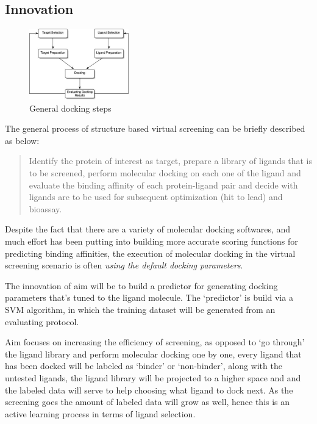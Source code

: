 \subsection{Innovation}

\begin{figure}%
\includegraphics[width=0.385\textwidth]{../figures/docking_flow.png}
\caption{General docking steps\cite{Morris2008}}
\label{fig:docking_flow}
\end{figure}

The general process of structure based virtual screening can be briefly described as below: 
\begin{quotation}
Identify the protein of interest as target, prepare a library of ligands that is to be screened, perform molecular docking on each one of the ligand and evaluate the binding affinity of each protein-ligand pair and decide with ligands are to be used for subsequent optimization (hit to lead) and bioassay.
\end{quotation}
Despite the fact that there are a variety of molecular docking softwares, and much effort has been putting into building more accurate scoring functions for predicting binding affinities, 
the execution of molecular docking in the virtual screening scenario is often \textit{using the default docking parameters}. 

The innovation of aim  will be to build a predictor for generating docking parameters that's tuned to the ligand molecule. The `predictor' is build via a SVM algorithm, in which the training dataset will be generated from an evaluating protocol.

Aim  focuses on increasing the efficiency of screening,
as opposed to `go through' the ligand library and perform molecular docking one by one, 
every ligand that has been docked will be labeled as `binder' or `non-binder', along with the untested ligands, the ligand library will be projected to a higher space and and the labeled data will serve to help choosing what ligand to dock next.
As the screening goes the amount of labeled data will grow as well, hence this is an active learning process in terms of ligand selection.

